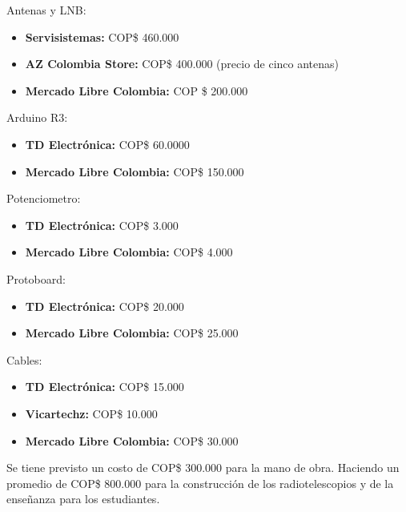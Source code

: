 Antenas y LNB:
\begin{itemize}
    \item \textbf{Servisistemas:} COP\$ 460.000
    \item \textbf{AZ Colombia Store:} COP\$ 400.000 (precio de cinco antenas)
    \item \textbf{{Mercado Libre Colombia:}} COP \$ 200.000
\end{itemize}

Arduino R3:
\begin{itemize}
    \item \textbf{TD Electrónica:} COP\$ 60.0000
    \item \textbf{Mercado Libre Colombia:} COP\$ 150.000
\end{itemize}

Potenciometro:
\begin{itemize}
    \item \textbf{TD Electrónica:} COP\$ 3.000
    \item \textbf{Mercado Libre Colombia:} COP\$ 4.000
\end{itemize}

Protoboard:
\begin{itemize}
    \item \textbf{TD Electrónica:} COP\$ 20.000
    \item \textbf{Mercado Libre Colombia:} COP\$ 25.000
\end{itemize}

Cables:
\begin{itemize}
    \item \textbf{TD Electrónica:} COP\$ 15.000
    \item \textbf{Vicartechz:} COP\$ 10.000
    \item \textbf{Mercado Libre Colombia:} COP\$ 30.000
\end{itemize}

Se tiene previsto un costo de COP\$ 300.000 para la mano de obra. Haciendo un 
promedio de COP\$ 800.000 para la construcción de los radiotelescopios y de 
la enseñanza para los estudiantes.
